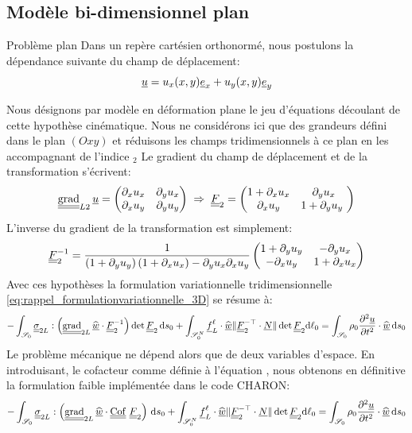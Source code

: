 \documentclass[10pt]{book}
\newcommand{\FLin}{\vec{f}^{\ell}}
\newcommand{\dlo}{\d\ell_{0}}
\begin{document}
\subsection{Modèle bi-dimensionnel plan}\label{Subsection:Modèle bi-dimensionnel plan}
\begin{Hypothese}{Problème plan} Dans un repère cartésien orthonormé, nous postulons la dépendance suivante du champ de déplacement:
$$\underline{u}=u_{x}(x,y)\underline{e}_{x}+u_{y}(x,y)\underline{e}_{y}$$
\end{Hypothese}
Nous désignons par \og modèle en déformation plane \fg{} le jeu d'équations découlant de cette hypothèse cinématique. Nous ne considérons ici que des grandeurs défini dans le plan $(Oxy)$ et réduisons les champs tridimensionnels à ce plan en les accompagnant de l'indice \og $_{2}$ \fg{} Le gradient du champ de déplacement et de la transformation s'écrivent:
$$\tgrad_{L2}\Dep=\begin{pmatrix}
\partial_{x}u_{x} & \partial_{y}u_{x}\\
\partial_{x}u_{y}  & \partial_{y}u_{y}\\
\end{pmatrix} \implique \GT_{2} = \begin{pmatrix}
1+\partial_{x}u_{x} & \partial_{y}u_{x}\\
\partial_{x}u_{y}  & 1+\partial_{y}u_{y}\
\end{pmatrix}$$
L'inverse du gradient de la transformation est simplement:
$$\underline{\underline{F}}_{2}^{-1} = \dfrac{1}{\left(1+\partial_{y}u_{y}\right)\left(1+\partial_{x}u_{x}\right)-\partial_{y}u_{x}\partial_{x}u_{y}}\begin{pmatrix}
1+\partial_{y}u_{y} & -\partial_{y}u_{x}\\
-\partial_{x}u_{y} & 1+\partial_{x}u_{x}\\
\end{pmatrix}$$
Avec ces hypothèses la formulation variationnelle tridimensionnelle \eqref{eq:rappel_formulationvariationnelle_3D} se résume à:
$$-\int_{\mathscr{S}_{0}}\SC_{2L}:\left(\tgrad_{2L}\DepVirt\cdot\GT_{2}^{-1}\right)\det\GT_{2}\dso+\int_{\mathscr{S}_{0}^{N}}\FLin_{L}\cdot\DepVirt\Vert\GT^{-\top}_{2}\cdot\NormaleInit\Vert\det\GT_{2}\dlo=\int_{\mathscr{S}_{0}}\rho_{0}\dfrac{\partial^{2}\Dep}{\partial t^{2}}\cdot\DepVirt\dso$$
Le problème mécanique ne dépend alors que de deux variables d'espace. En introduisant, le cofacteur comme définie à l'équation \eref{eq:defo_conjug_cofac}, nous obtenons en définitive la formulation faible implémentée dans le code CHARON:
\begin{equation}
-\int_{\mathscr{S}_{0}}\SC_{2L}:\left(\tgrad_{2L}\DepVirt\cdot\Cof\GT_{2}\right)\dso+\int_{\mathscr{S}_{0}^{N}}\FLin_{L}\cdot\DepVirt\Vert\GT^{-\top}_{2}\cdot\NormaleInit\Vert\det\GT_{2}\dlo=\int_{\mathscr{S}_{0}}\rho_{0}\dfrac{\partial^{2}\Dep}{\partial t^{2}}\cdot\DepVirt\dso
\label{eq:rappel_formulationvariationnelle_2D_plan}
\end{equation}
\end{document}

